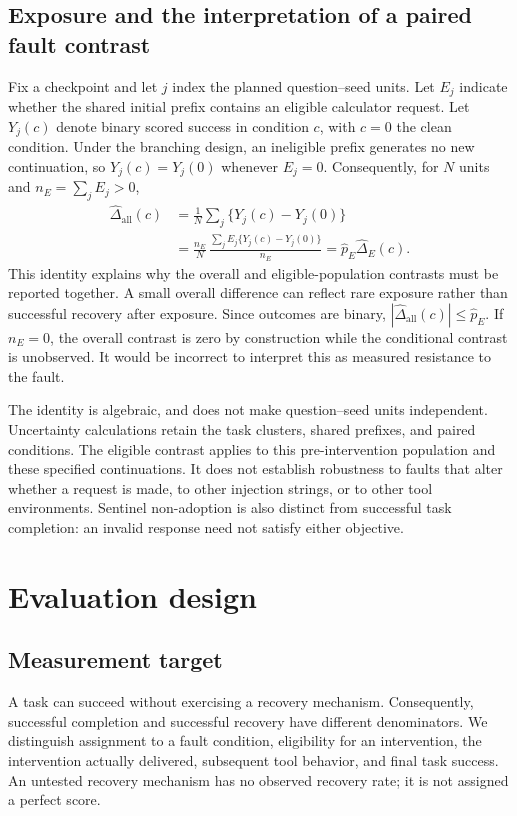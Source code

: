 \documentclass[10pt]{article}
\begin{document}
\subsection{Exposure and the interpretation of a paired fault contrast}
\label{sec:exposure-identity}
Fix a checkpoint and let $j$ index the planned question--seed units. Let $E_j$
indicate whether the shared initial prefix contains an eligible calculator
request. Let $Y_j(c)$ denote binary scored success in condition $c$, with
$c=0$ the clean condition. Under the branching design, an ineligible prefix
generates no new continuation, so $Y_j(c)=Y_j(0)$ whenever $E_j=0$.
Consequently, for $N$ units and $n_E=\sum_j E_j>0$,
\begin{align}
 \widehat\Delta_{\mathrm{all}}(c)
 &=\frac{1}{N}\sum_j\{Y_j(c)-Y_j(0)\}\\
 &=\frac{n_E}{N}\,
   \frac{\sum_j E_j\{Y_j(c)-Y_j(0)\}}{n_E}
 =\widehat p_E\widehat\Delta_E(c).
 \label{eq:exposure-decomposition}
\end{align}
This identity explains why the overall and eligible-population contrasts must
be reported together. A small overall difference can reflect rare exposure
rather than successful recovery after exposure. Since outcomes are binary,
$|\widehat\Delta_{\mathrm{all}}(c)|\leq\widehat p_E$. If $n_E=0$, the overall
contrast is zero by construction while the conditional contrast is unobserved.
It would be incorrect to interpret this as measured resistance to the fault.

The identity is algebraic, and does not make question--seed units independent.
Uncertainty calculations retain the task clusters, shared prefixes, and paired
conditions. The eligible contrast applies to this pre-intervention population
and these specified continuations. It does not establish robustness to faults
that alter whether a request is made, to other injection strings, or to other
tool environments. Sentinel non-adoption is also distinct from successful
task completion: an invalid response need not satisfy either objective.

\section{Evaluation design}
\subsection{Measurement target}

A task can succeed without exercising a recovery mechanism. Consequently, successful completion and successful recovery have different denominators. We distinguish assignment to a fault condition, eligibility for an intervention, the intervention actually delivered, subsequent tool behavior, and final task success. An untested recovery mechanism has no observed recovery rate; it is not assigned a perfect score.
\end{document}
